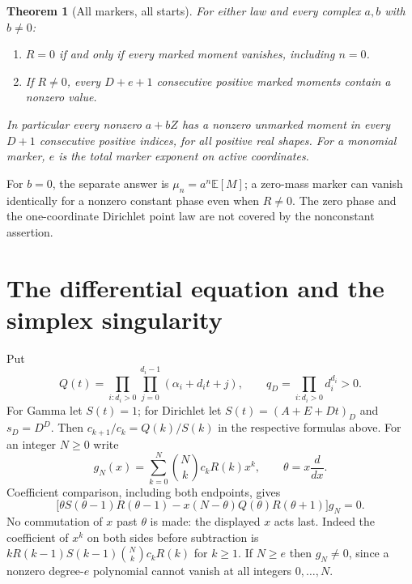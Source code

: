 \documentclass[11pt]{article}
\newtheorem{theorem}{Theorem}
\newcommand{\E}{\mathbb E}
\begin{document}
\begin{theorem}[All markers, all starts]\label{thm:window}
For either law and every complex $a,b$ with $b\ne0$:
\begin{enumerate}
\item $R=0$ if and only if every marked moment vanishes, including $n=0$.
\item If $R\ne0$, every $D+e+1$ consecutive positive marked moments
      contain a nonzero value.
\end{enumerate}
In particular every nonzero $a+bZ$ has a nonzero unmarked moment in every
$D+1$ consecutive positive indices, for all positive real shapes.
For a monomial marker, $e$ is the total marker exponent on active coordinates.
\end{theorem}
For $b=0$, the separate answer is $\mu_n=a^n\E[M]$; a zero-mass marker
can vanish identically for a nonzero constant phase even when $R\ne0$.
The zero phase and the one-coordinate Dirichlet point law are not covered
by the nonconstant assertion.

\section{The differential equation and the simplex singularity}
Put
\[
 Q(t)=\prod_{i:d_i>0}\prod_{j=0}^{d_i-1}(\alpha_i+d_it+j),\qquad
 q_D=\prod_{i:d_i>0}d_i^{d_i}>0.
\]
For Gamma let $S(t)=1$; for Dirichlet let
$S(t)=(A+E+Dt)_D$ and $s_D=D^D$.
Then $c_{k+1}/c_k=Q(k)/S(k)$ in the respective formulas above.
For an integer $N\geq0$ write
\[
 g_N(x)=\sum_{k=0}^N\binom Nk c_k R(k)x^k,
 \qquad \theta=x\frac{d}{dx}.
\]
Coefficient comparison, including both endpoints, gives
\[
 \big[\theta S(\theta-1)R(\theta-1)
       -x(N-\theta)Q(\theta)R(\theta+1)\big]g_N=0.    \tag{3}
\]
No commutation of $x$ past $\theta$ is made: the displayed $x$ acts last.
Indeed the coefficient of $x^k$ on both sides before subtraction is
$kR(k-1)S(k-1)\binom Nk c_kR(k)$ for $k\geq1$.
If $N\geq e$ then $g_N\ne0$, since a nonzero degree-$e$ polynomial
cannot vanish at all integers $0,\ldots,N$.
\end{document}
